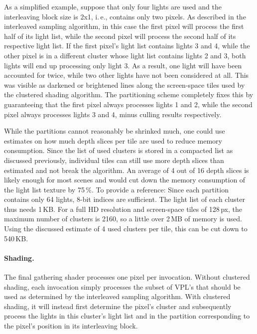 As a simplified example, suppose that only four lights are used and the interleaving block size is 2x1, i.\,e., contains only two pixels. As described in the interleaved sampling algorithm, in this case the first pixel will process the first half of its light list, while the second pixel will process the second half of its respective light list. If the first pixel's light list contains lights 3 and 4, while the other pixel is in a different cluster whose light list contains lights 2 and 3, both lights will end up processing only light 3. As a result, one light will have been accounted for twice, while two other lights have not been considered at all. This was visible as darkened or brightened lines along the screen-space tiles used by the clustered shading algorithm. The partitioning scheme completely fixes this by guaranteeing that the first pixel always processes lights 1 and 2, while the second pixel always processes lights 3 and 4, minus culling results respectively.

While the partitions cannot reasonably be shrinked much, one could use estimates on how much depth slices per tile are used to reduce memory consumption. Since the list of used clusters is stored in a compacted list as discussed previously, individual tiles can still use more depth slices than estimated and not break the algorithm. An average of 4 out of 16 depth slices is likely enough for most scenes and would cut down the memory consumption of the light list texture by 75\,\%. To provide a reference: Since each partition contains only 64 lights, 8-bit indices are sufficient. The light list of each cluster thus needs 1\,KB. For a full HD resolution and screen-space tiles of 128\,px, the maximum number of clusters is 2160, so a little over 2\,MB of memory is used. Using the discussed estimate of 4 used clusters per tile, this can be cut down to 540\,KB.

\paragraph{Shading.}
The final gathering shader processes one pixel per invocation. Without clustered shading, each invocation simply processes the subset of VPL's that should be used as determined by the interleaved sampling algorithm. With clustered shading, it will instead first determine the pixel's cluster and subsequently process the lights in this cluster's light list and in the partition corresponding to the pixel's position in its interleaving block.


